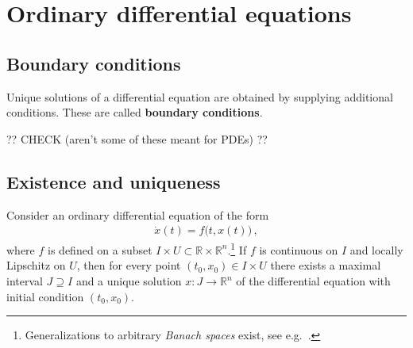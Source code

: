 \chapter{Ordinary differential equations}

\section{Boundary conditions}

    Unique solutions of a differential equation are obtained by supplying additional conditions. These are called \textbf{boundary conditions}.




    ?? CHECK (aren't some of these meant for PDEs) ??

\section{Existence and uniqueness}

    \begin{theorem}\label{ode:picard_lindelof}
        Consider an ordinary differential equation of the form
        \begin{gather}
            \dot{x}(t) = f\bigl(t,x(t)\bigr)\,,
        \end{gather}
        where $f$ is defined on a subset $I\times U\subset\mathbb{R}\times\mathbb{R}^n$.\footnote{Generalizations to arbitrary \textit{Banach spaces} exist, see e.g.~\cite{choquet-bruhat_analysis_1991}.} If $f$ is continuous on $I$ and locally Lipschitz on $U$, then for every point $(t_0,x_0)\in I\times U$ there exists a maximal interval $J\supseteq I$ and a unique solution $x:J\rightarrow\mathbb{R}^n$ of the differential equation with initial condition $(t_0,x_0)$.
    \end{theorem}

